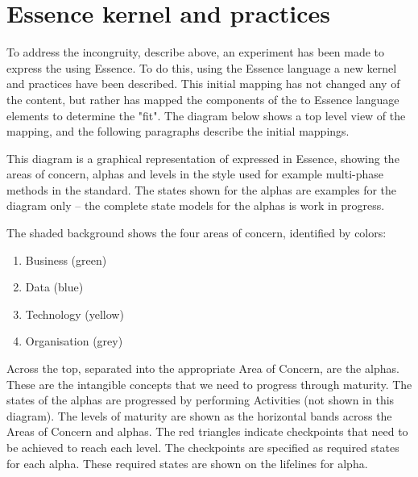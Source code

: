 \section{ Essence kernel and practices}\label{subsec:kg-mm-essence-kernel-and-practices}

To address the incongruity, describe above, an experiment has been made to express the 
using Essence.
To do this, using the Essence language a new kernel and practices have been described.
This initial mapping has not changed any of the content, but rather has mapped the components of
the  to Essence language elements to determine the "fit".
The diagram below shows a top level view of the mapping, and the following paragraphs describe the initial mappings.


This diagram is a graphical representation of  expressed in Essence, showing the areas of concern,
alphas and levels in the style used for example multi-phase methods in the  standard.
The states shown for the alphas are examples for the diagram only -- the complete state models for the alphas
is work in progress.

The shaded background shows the four areas of concern, identified by colors:

\begin{enumerate}
    \item Business (green)
    \item Data (blue)
    \item Technology (yellow)
    \item Organisation (grey)
\end{enumerate}

Across the top, separated into the appropriate Area of Concern, are the alphas.
These are the intangible concepts that we need to progress through maturity.
The states of the alphas are progressed by performing Activities (not shown in this diagram).
The levels of maturity are shown as the horizontal bands across the Areas of Concern and alphas.
The red triangles indicate checkpoints that need to be achieved to reach each level.
The checkpoints are specified as required states for each alpha.
These required states are shown on the lifelines for alpha.

